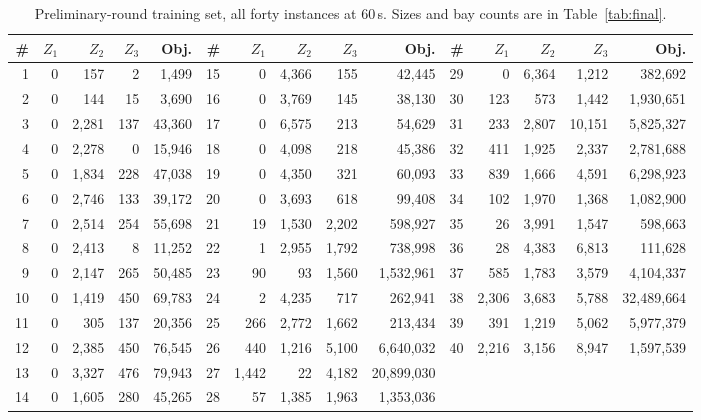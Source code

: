 \documentclass[runningheads]{llncs}
\begin{document}
\begin{table}[t]
\centering
\caption{Preliminary-round training set, all forty instances at $60$\,s. Sizes and bay counts are
in Table~\ref{tab:final}.}
\label{tab:train}
\footnotesize
\setlength{\tabcolsep}{1pt}
\begin{tabular}{rrrrr@{\;}rrrrr@{\;}rrrrr}
\toprule
\# & $Z_1$ & $Z_2$ & $Z_3$ & Obj. & \# & $Z_1$ & $Z_2$ & $Z_3$ & Obj. & \# & $Z_1$ & $Z_2$ & $Z_3$ & Obj. \\
\midrule
1 & 0 & 157 & 2 & 1{,}499 & 15 & 0 & 4{,}366 & 155 & 42{,}445 & 29 & 0 & 6{,}364 & 1{,}212 & 382{,}692 \\
2 & 0 & 144 & 15 & 3{,}690 & 16 & 0 & 3{,}769 & 145 & 38{,}130 & 30 & 123 & 573 & 1{,}442 & 1{,}930{,}651 \\
3 & 0 & 2{,}281 & 137 & 43{,}360 & 17 & 0 & 6{,}575 & 213 & 54{,}629 & 31 & 233 & 2{,}807 & 10{,}151 & 5{,}825{,}327 \\
4 & 0 & 2{,}278 & 0 & 15{,}946 & 18 & 0 & 4{,}098 & 218 & 45{,}386 & 32 & 411 & 1{,}925 & 2{,}337 & 2{,}781{,}688 \\
5 & 0 & 1{,}834 & 228 & 47{,}038 & 19 & 0 & 4{,}350 & 321 & 60{,}093 & 33 & 839 & 1{,}666 & 4{,}591 & 6{,}298{,}923 \\
6 & 0 & 2{,}746 & 133 & 39{,}172 & 20 & 0 & 3{,}693 & 618 & 99{,}408 & 34 & 102 & 1{,}970 & 1{,}368 & 1{,}082{,}900 \\
7 & 0 & 2{,}514 & 254 & 55{,}698 & 21 & 19 & 1{,}530 & 2{,}202 & 598{,}927 & 35 & 26 & 3{,}991 & 1{,}547 & 598{,}663 \\
8 & 0 & 2{,}413 & 8 & 11{,}252 & 22 & 1 & 2{,}955 & 1{,}792 & 738{,}998 & 36 & 28 & 4{,}383 & 6{,}813 & 111{,}628 \\
9 & 0 & 2{,}147 & 265 & 50{,}485 & 23 & 90 & 93 & 1{,}560 & 1{,}532{,}961 & 37 & 585 & 1{,}783 & 3{,}579 & 4{,}104{,}337 \\
10 & 0 & 1{,}419 & 450 & 69{,}783 & 24 & 2 & 4{,}235 & 717 & 262{,}941 & 38 & 2{,}306 & 3{,}683 & 5{,}788 & 32{,}489{,}664 \\
11 & 0 & 305 & 137 & 20{,}356 & 25 & 266 & 2{,}772 & 1{,}662 & 213{,}434 & 39 & 391 & 1{,}219 & 5{,}062 & 5{,}977{,}379 \\
12 & 0 & 2{,}385 & 450 & 76{,}545 & 26 & 440 & 1{,}216 & 5{,}100 & 6{,}640{,}032 & 40 & 2{,}216 & 3{,}156 & 8{,}947 & 1{,}597{,}539 \\
13 & 0 & 3{,}327 & 476 & 79{,}943 & 27 & 1{,}442 & 22 & 4{,}182 & 20{,}899{,}030 &  &  &  &  &  \\
14 & 0 & 1{,}605 & 280 & 45{,}265 & 28 & 57 & 1{,}385 & 1{,}963 & 1{,}353{,}036 &  &  &  &  &  \\
\bottomrule
\end{tabular}
\end{table}
\end{document}
